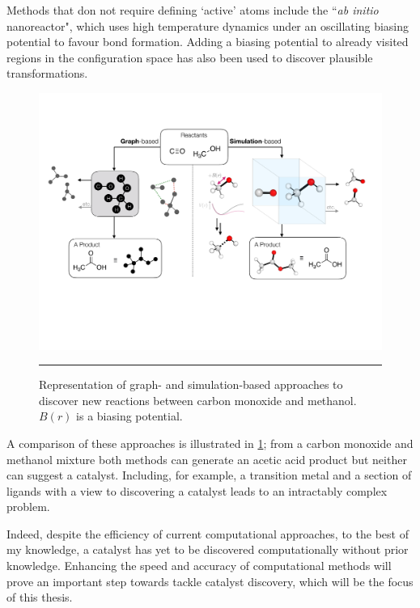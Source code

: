 \documentclass[../main.tex]{subfiles}
\begin{document}
Methods that don not require defining `active' atoms include the ``\emph{ab initio} nanoreactor"\cite{Wang2014}, which uses high temperature dynamics under an oscillating biasing potential to favour bond formation. Adding a biasing potential to already visited regions in the configuration space has also been used to discover plausible transformations.\cite{Grimme2019} 


\begin{figure}[t!]
	\centering
	\vspace{0.4cm}
	\includegraphics[width=14cm]{1/figs/fig2/fig2.pdf}
	\vspace{0.4cm}
	\hrule
	\caption{Representation of graph- and simulation-based approaches to discover new reactions between carbon monoxide and methanol. $B(r)$ is a biasing potential.}
	\label{fig::intro_X3}
\end{figure}

A comparison of these approaches is illustrated in \figurename{ \ref{fig::intro_X3}}; from a carbon monoxide and methanol mixture both methods can generate an acetic acid product but neither can suggest a catalyst. Including, for example, a transition metal and a section of ligands with a view to discovering a catalyst leads to an intractably complex problem. 

Indeed, despite the efficiency of current computational approaches, to the best of my knowledge, a catalyst has yet to be discovered computationally without prior knowledge. Enhancing the speed and accuracy of computational methods will prove an important step towards tackle catalyst discovery, which will be the focus of this thesis.
\end{document}
